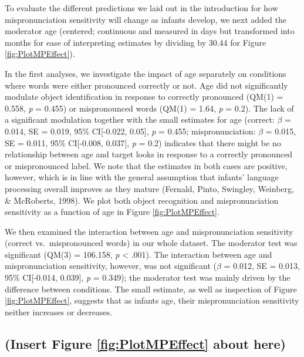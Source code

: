 \documentclass[man]{apa6}
\begin{document}
To evaluate the different predictions we laid out in the introduction for how mispronunciation sensitivity will change as infants develop, we next added the moderator age (centered; continuous and measured in days but transformed into months for ease of interpreting estimates by dividing by 30.44 for Figure \ref{fig:PlotMPEffect}).

In the first analyses, we investigate the impact of age separately on conditions where words were either pronounced correctly or not. Age did not significantly modulate object identification in response to correctly pronounced (QM(1) = 0.558, \emph{p} = 0.455) or mispronounced words (QM(1) = 1.64, \emph{p} = 0.2). The lack of a significant modulation together with the small estimates for age (correct: \(\beta\) = 0.014, SE = 0.019, 95\% CI{[}-0.022, 0.05{]}, \emph{p} = 0.455; mispronunciation: \(\beta\) = 0.015, SE = 0.011, 95\% CI{[}-0.008, 0.037{]}, \emph{p} = 0.2) indicates that there might be no relationship between age and target looks in response to a correctly pronounced or mispronounced label. We note that the estimates in both cases are positive, however, which is in line with the general assumption that infants' language processing overall improves as they mature (Fernald, Pinto, Swingley, Weinberg, \& McRoberts, 1998). We plot both object recognition and mispronunciation sensitivity as a function of age in Figure \ref{fig:PlotMPEffect}.

We then examined the interaction between age and mispronunciation sensitivity (correct vs.~mispronounced words) in our whole dataset. The moderator test was significant (QM(3) = 106.158, \emph{p} \textless{} .001). The interaction between age and mispronunciation sensitivity, however, was not significant (\(\beta\) = 0.012, SE = 0.013, 95\% CI{[}-0.014, 0.039{]}, \emph{p} = 0.349); the moderator test was mainly driven by the difference between conditions. The small estimate, as well as inspection of Figure \ref{fig:PlotMPEffect}, suggests that as infants age, their mispronunciation sensitivity neither increases or decreases.

\hypertarget{insert-figure-reffigplotmpeffect-about-here}{%
\subsection{(Insert Figure \ref{fig:PlotMPEffect} about here)}\label{insert-figure-reffigplotmpeffect-about-here}}
\end{document}
